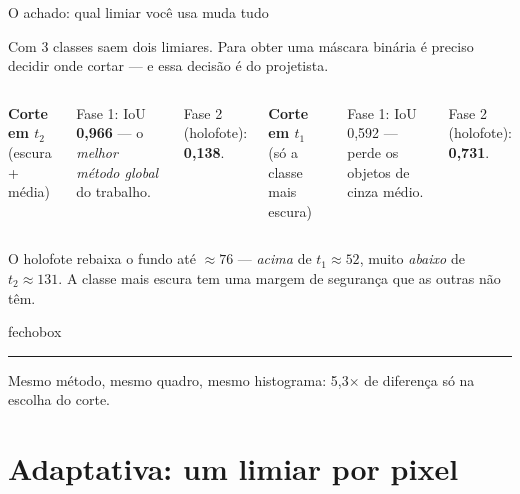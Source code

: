 \documentclass[aspectratio=169,12pt]{beamer}
\newcommand{\multi}[1]{\textcolor{cMulti}{\textbf{#1}}}
\newcommand{\sub}[1]{{\small\textcolor{cinza}{#1}}}
\newenvironment{fecho}
  {\begin{beamercolorbox}[wd=\textwidth, sep=.75em, leftskip=.6em]{fechobox}%
   \hspace{-.6em}\textcolor{brasa}{\rule[-.35em]{2.5pt}{1.15em}}\hspace{.5em}\ignorespaces}
  {\end{beamercolorbox}}
\begin{document}
\begin{frame}{O achado: qual limiar você usa muda tudo}

  Com 3 classes saem dois limiares. Para obter uma máscara binária é preciso
  decidir onde cortar — e essa decisão é do projetista.

  \vspace{.8em}
  \begin{columns}[T,onlytextwidth]
      \multi{Corte em $t_2$} \sub{(escura + média)}

      \vspace{.4em}
      Fase 1: IoU \textbf{0,966} — o \emph{melhor método global} do trabalho.

      \vspace{.4em}
      Fase 2 (holofote): \textcolor{cMulti}{\textbf{0,138}}.

      \multi{Corte em $t_1$} \sub{(só a classe mais escura)}

      \vspace{.4em}
      Fase 1: IoU 0,592 — perde os objetos de cinza médio.

      \vspace{.4em}
      Fase 2 (holofote): \textcolor{cAdapt}{\textbf{0,731}}.
  \end{columns}

  \vspace{.8em}
  \sub{O holofote rebaixa o fundo até $\approx 76$ — \emph{acima} de
  $t_1\approx52$, muito \emph{abaixo} de $t_2\approx131$. A classe mais escura
  tem uma margem de segurança que as outras não têm.}

  \vspace{.4em}
  \begin{fecho}
    Mesmo método, mesmo quadro, mesmo histograma: \alert{5,3$\times$} de
    diferença só na escolha do corte.
  \end{fecho}

\end{frame}

\section{Adaptativa: um limiar por pixel}
\end{document}
